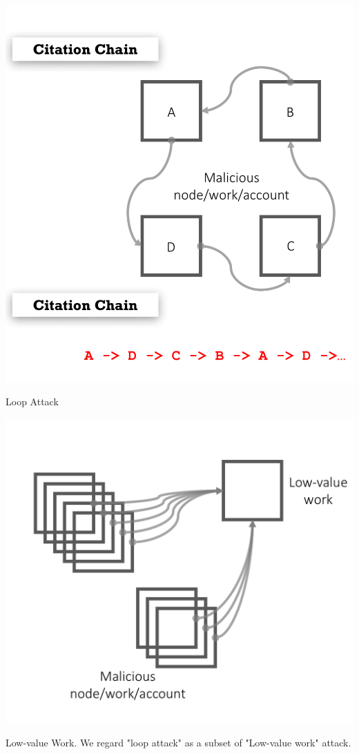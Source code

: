 \documentclass[a4paper,oneside,openany]{tufte-book}
\begin{document}
\begin{marginfigure}
  \includegraphics[width=\textwidth]{fig/loopA.png}
  \caption{Loop Attack}
\end{marginfigure}



\begin{marginfigure}
  \includegraphics[width=\textwidth]{fig/lowV.png}
  \caption{Low-value Work. We regard "loop attack" as a subset of "Low-value work" attack. }
\end{marginfigure}
\end{document}
